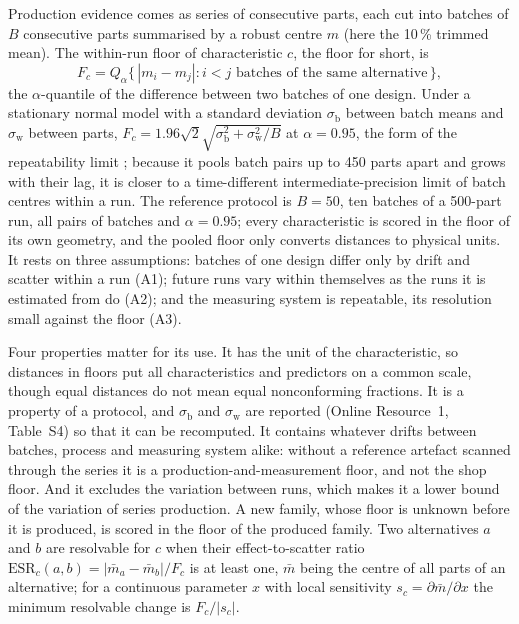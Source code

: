 \documentclass[pdflatex,sn-basic,lineno]{sn-jnl}
\newcommand{\ORt}[1]{Online Resource~1, Table~S#1}
\begin{document}
Production evidence comes as series of consecutive parts, each cut into batches of $B$ consecutive parts summarised by a robust centre $m$ (here the 10\,\% trimmed mean). The within-run floor of characteristic $c$, the floor for short, is
\begin{equation}
F_c = Q_\alpha\bigl\{\,|m_i - m_j| : i< j \text{ batches of the same alternative}\,\bigr\},
\label{eq:floor}
\end{equation}
the $\alpha$-quantile of the difference between two batches of one design. Under a stationary normal model with a standard deviation $\sigma_\mathrm{b}$ between batch means and $\sigma_\mathrm{w}$ between parts, $F_c = 1.96\sqrt{2}\sqrt{\sigma_\mathrm{b}^2+\sigma_\mathrm{w}^2/B}$ at $\alpha=0.95$, the form of the repeatability limit \citep{iso2025repeatability, iso1994accuracy}; because it pools batch pairs up to 450 parts apart and grows with their lag, it is closer to a time-different intermediate-precision limit \citep{iso2023intermediate} of batch centres within a run. The reference protocol is $B=50$, ten batches of a 500-part run, all pairs of batches and $\alpha=0.95$; every characteristic is scored in the floor of its own geometry, and the pooled floor only converts distances to physical units. It rests on three assumptions: batches of one design differ only by drift and scatter within a run (A1); future runs vary within themselves as the runs it is estimated from do (A2); and the measuring system is repeatable, its resolution small against the floor (A3).

Four properties matter for its use. It has the unit of the characteristic, so distances in floors put all characteristics and predictors on a common scale, though equal distances do not mean equal nonconforming fractions. It is a property of a protocol, and $\sigma_\mathrm{b}$ and $\sigma_\mathrm{w}$ are reported (\ORt{4}) so that it can be recomputed. It contains whatever drifts between batches, process and measuring system alike: without a reference artefact scanned through the series it is a production-and-measurement floor, and not the shop floor. And it excludes the variation between runs, which makes it a lower bound of the variation of series production. A new family, whose floor is unknown before it is produced, is scored in the floor of the produced family. Two alternatives $a$ and $b$ are resolvable for $c$ when their effect-to-scatter ratio $\mathrm{ESR}_c(a,b) = |\bar m_a - \bar m_b|/F_c$ is at least one, $\bar m$ being the centre of all parts of an alternative; for a continuous parameter $x$ with local sensitivity $s_c=\partial\bar m/\partial x$ the minimum resolvable change is $F_c/|s_c|$.
\end{document}
